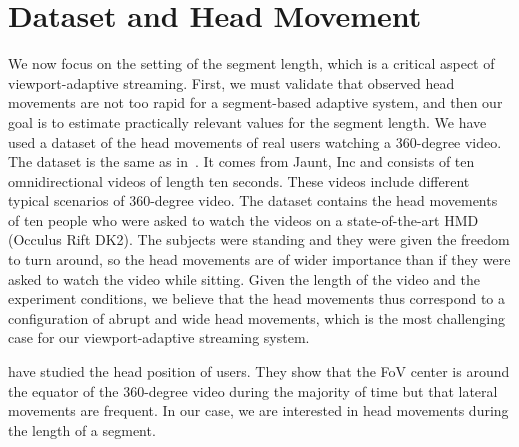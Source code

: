 \section{Dataset and Head Movement}
\label{sec:dataset}

We now focus on the setting of the segment length, which is a critical aspect of viewport-adaptive streaming.
First, we must validate that observed head movements are not too rapid for a segment-based
adaptive system, and then our goal is to
estimate practically relevant values for the segment length.
We have used a dataset of the head movements of real users watching
a 360-degree video. The dataset is the same as in~\cite{yu_framework_2015}. It comes from
Jaunt, Inc and consists of ten omnidirectional videos of length ten seconds. These videos include
different typical scenarios of 360-degree video. The dataset contains the head movements of
ten people who were asked to watch the videos on a state-of-the-art \ac{HMD} (Occulus Rift DK2).
The subjects were standing and they were given the freedom to turn around, so the head movements
are of wider importance than if they were asked to watch the video while sitting. Given the length of
the video and the experiment conditions, we believe that the head movements thus correspond to
a configuration of abrupt and wide head movements, which is the most challenging case for our viewport-adaptive streaming system.

\citet{yu_framework_2015} have studied the head position of users. They show that the
FoV center is around the equator of the 360-degree video
during the majority of time but that lateral movements are frequent. In our case, we are interested in head
movements during the length of a segment.

